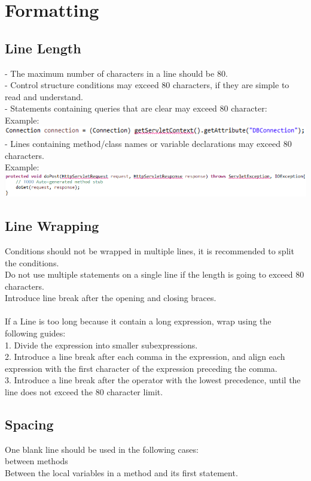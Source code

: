 \documentclass[a4paper,12pt]{report}
\begin{document}
\section{Formatting}
\subsection{Line Length} 
	- The maximum number of characters in a line should be 80.\\
	- Control structure conditions may exceed 80 characters, if they are simple to read and understand.\\
	- Statements containing queries that are clear may exceed 80 character:\\
	Example:\\ 
	\includegraphics{Statement}  \\
	- Lines containing method/class names or variable declarations may exceed 80 characters.\\
	Example:\\ 
	\includegraphics{LongMethodName}
\subsection{Line Wrapping}
	Conditions should not be wrapped in multiple lines, it is recommended to split the conditions.\\
	Do not use multiple statements on a single line if the length is going to exceed 80 characters.\\
	Introduce line break after the opening and closing braces.\\\\
	If a Line is too long because it contain a long expression, wrap using the following guides:\\
	1. Divide the expression into smaller subexpressions.\\
	2. Introduce a line break after each comma in the expression, and align each expression with the first character of the expression preceding the comma.\\
	3. Introduce a line break after the operator with the lowest precedence, until the line does not exceed the 80 character limit.
\subsection{Spacing}
One blank line should be used in the following cases:\\
\textbullet between methods\\
\textbullet Between the local variables in a method and its first statement.
\end{document}
